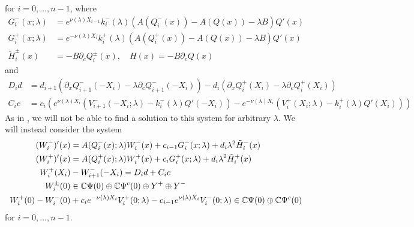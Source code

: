 \documentclass[10pt,reqno]{amsart}
\theoremstyle{plain}
\theoremstyle{definition}
\theoremstyle{remark}
\numberwithin{theorem}{section}
\numberwithin{equation}{section}
\begin{document}
for $i = 0, \dots, n-1$, where
\begin{align}\label{defGH}
G_i^-(x; \lambda) &= e^{\nu(\lambda)X_{i-1}} k_i^-(\lambda)\left( A(Q_i^-(x)) - A(Q(x)) - \lambda B \right) Q'(x) \\
G_i^+(x; \lambda) &= e^{-\nu(\lambda)X_i} k_i^+(\lambda)\left( A(Q_i^+(x)) - A(Q(x)) - \lambda B \right) Q'(x) \\
\tilde{H}_i^\pm(x) &= -B \partial_c Q_i^\pm(x), \quad H(x) = -B \partial_c Q(x)
\end{align}
and
\begin{align}
D_i d &= d_{i+1}\left(\partial_x Q_{i+1}^-(-X_i) - \lambda \partial_c Q_{i+1}^-(-X_i)\right) - d_i \left( \partial_x Q_i^+(X_i) - \lambda \partial_c Q_i^+(X_i) \right) \label{defDid} \\
C_i c &= c_i \left( e^{\nu(\lambda) X_i} (V_{i+1}^-(-X_i; \lambda) - k_i^-(\lambda)Q'(-X_i)) - e^{-\nu(\lambda) X_i} (V_i^+(X_i; \lambda) - k_i^+(\lambda) Q'(X_i)) \right) \label{defCic}
\end{align}
As in \cite{Sandstede1998}, we will not be able to find a solution to this system for arbitrary $\lambda$. We will instead consider the system
\begin{equation}\label{eigsystem}
\begin{aligned}
(W_i^-)'(x) &= A(Q_i^-(x); \lambda) W_i^-(x) + c_{i-1} G_i^-(x; \lambda) + d_i \lambda^2 \tilde{H}_i^-(x) \\
(W_i^+)'(x) &= A(Q_i^+(x); \lambda) W_i^+(x) + c_i G_i^+(x; \lambda) + d_i \lambda^2 \tilde{H}_i^+(x) \\
W_i^+(X_i) &- W_{i+1}^-(-X_i) = D_i d + C_i c \\
W_i^\pm(0) &\in \mathbb{C} \Psi(0) \oplus \mathbb{C} \Psi^c(0) \oplus Y^+ \oplus Y^- \\
W_i^+(0) - W_i^-(0) &+ c_i e^{-\nu(\lambda)X_i}V_i^+(0; \lambda) - c_{i-1} e^{\nu(\lambda)X_i} V_i^-(0; \lambda) \in \mathbb{C} \Psi(0) \oplus \mathbb{C} \Psi^c(0) 
\end{aligned}
\end{equation}
for $i = 0, \dots, n-1$. 
\end{document}
